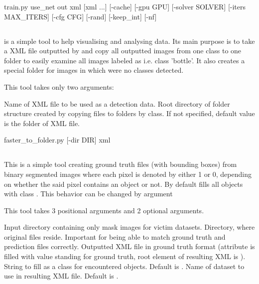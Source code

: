 \begin{usage}
train.py use_net out xml [xml ...] [-cache] [-gpu GPU] [-solver SOLVER] [-iters MAX_ITERS] [-cfg CFG] [-rand] [-keep_int] [-nf]
\end{usage}

\subsection{} \label{ftf}
 is a simple tool to help visualising and analysing data. Its main purpose is to take a XML file outputted by \hyperref[rec]{} and copy all outputted images from one class to one folder to easily examine all images labeled as i.e. class 'bottle'. It also creates a special folder for images in which were no classes detected.

This tool takes only two arguments:
\begin{description}
 Name of XML file to be used as a detection data.
 Root directory of folder structure created by copying files to folders by class. If not specified, default value is the folder of XML file.
\end{description}

\begin{usage}
faster_to_folder.py [-dir DIR] xml
\end{usage}

\subsection{} \label{bbox}
This is a simple tool creating ground truth files (with bounding boxes) from binary segmented images where each pixel is denoted by either 1 or 0, depending on whether the said pixel contains an object or not. By default fills all objects with class . This behavior can be changed by argument 

This tool takes 3 positional arguments and 2 optional arguments.
\begin{description}
 Input directory containing only mask images for victim datasets.
 Directory, where original files reside. Important for being able to match ground truth and prediction files correctly.
 Outputted XML file in ground truth format (attribute  is filled with value  standing for ground truth, root element of resulting XML is ).
 String to fill as a class for encountered objects. Default is .
 Name of dataset to use in resulting XML file. Default is .
\end{description}
 
